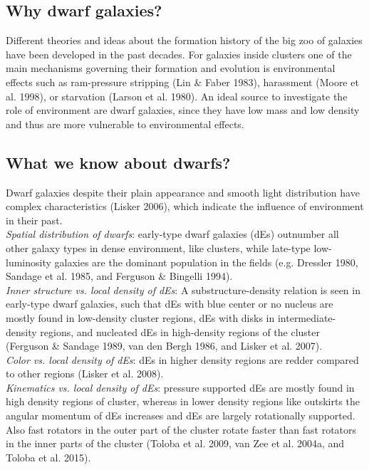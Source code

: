 \documentclass{aa}
\begin{document}
\subsection{Why dwarf galaxies?}

Different theories and ideas about the formation history of the big zoo of galaxies have been developed in the past decades. For galaxies inside clusters one of the main mechanisms governing their formation and evolution is environmental effects such as ram-pressure stripping (Lin \& Faber 1983), harassment (Moore et al. 1998), or starvation (Larson et al. 1980). An ideal source to investigate the role of environment are dwarf galaxies, since they have low mass and low density and thus are more vulnerable to environmental effects.
\subsection{What we know about dwarfs?}
Dwarf galaxies despite their plain appearance and smooth light distribution have complex characteristics (Lisker 2006), which indicate the influence of environment in their past. \\ \textit{Spatial distribution of dwarfs}: early-type dwarf galaxies (dEs) outnumber all other galaxy types in dense environment, like clusters, while late-type low-luminosity galaxies are the dominant population in the fields (e.g. Dressler 1980, Sandage et al. 1985, and Ferguson \& Bingelli 1994).\\ \textit{Inner structure vs. local density of dEs}: A substructure-density relation is seen in early-type dwarf galaxies, such that dEs with blue center or no nucleus are mostly found in low-density cluster regions, dEs with disks in intermediate-density regions, and nucleated dEs in high-density regions of the cluster (Ferguson \& Sandage 1989, van den Bergh 1986, and Lisker et al. 2007). \\ \textit{Color vs. local density of dEs}: dEs in higher density regions are redder compared to other regions (Lisker et al. 2008). \\ \textit{Kinematics vs. local density of dEs}: pressure supported dEs are mostly found in high density regions of cluster, whereas in lower density regions like outskirts the angular momentum of dEs increases and dEs are largely rotationally supported. Also fast rotators in the outer part of the cluster rotate faster than fast rotators in the inner parts of the cluster (Toloba et al. 2009, van Zee et al. 2004a, and Toloba et al. 2015).\\
\end{document}
